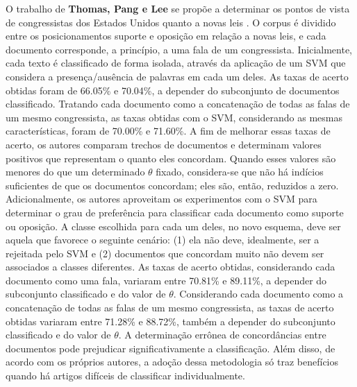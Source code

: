 O trabalho de \textbf{Thomas, Pang e Lee} se propõe a determinar os pontos de vista de congressistas dos Estados Unidos quanto a novas leis \cite{get-out-the-vote}. O corpus é dividido entre os posicionamentos suporte e oposição em relação a novas leis, e cada documento corresponde, a princípio, a uma fala de um congressista. Inicialmente, cada texto é classificado de forma isolada, através da aplicação de um SVM que considera a presença/ausência de palavras em cada um deles. As taxas de acerto obtidas foram de 66.05\% e 70.04\%, a depender do subconjunto de documentos classificado. Tratando cada documento como a concatenação de todas as falas de um mesmo congressista, as taxas obtidas com o SVM, considerando as mesmas características, foram de 70.00\% e 71.60\%. A fim de melhorar essas taxas de acerto, os autores comparam trechos de documentos e determinam valores positivos que representam o quanto eles concordam. Quando esses valores são menores do que um determinado \ensuremath{\theta} fixado, considera-se que não há indícios suficientes de que os documentos concordam; eles são, então, reduzidos a zero. Adicionalmente, os autores aproveitam os experimentos com o SVM para determinar o grau de preferência para classificar cada documento como suporte ou oposição. A classe escolhida para cada um deles, no novo esquema, deve ser aquela que favorece o seguinte cenário: (1) ela não deve, idealmente, ser a rejeitada pelo SVM e (2) documentos que concordam muito não devem ser associados a classes diferentes. As taxas de acerto obtidas, considerando cada documento como uma fala, variaram entre 70.81\% e 89.11\%, a depender do subconjunto classificado e do valor de \ensuremath{\theta}. Considerando cada documento como a concatenação de todas as falas de um mesmo congressista, as taxas de acerto obtidas variaram entre 71.28\% e 88.72\%, também a depender do subconjunto classificado e do valor de \ensuremath{\theta}. A determinação errônea de concordâncias entre documentos pode prejudicar significativamente a classificação. Além disso, de acordo com os próprios autores, a adoção dessa metodologia só traz benefícios quando há artigos difíceis de classificar individualmente.    

